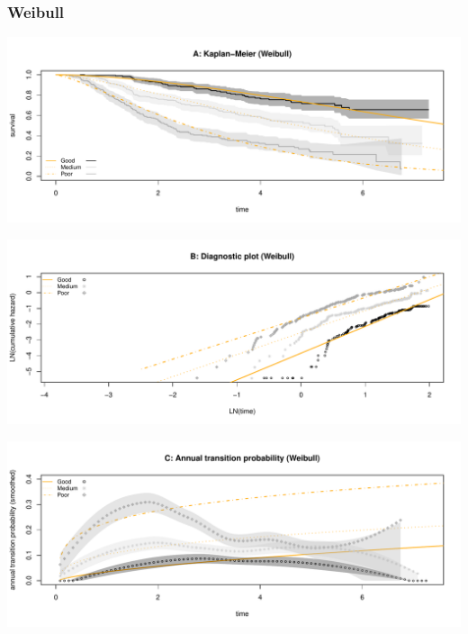 \documentclass[
]{article}
\begin{document}
\clearpage

\subsubsection{Weibull}\label{weibull}

\begin{flushleft}\includegraphics[height=0.25\textheight]{BC_OS_output/Images/Figure_param_models-4} \end{flushleft}

\begin{flushleft}\includegraphics[height=0.25\textheight]{BC_OS_output/Images/Figure_param_models-5} \end{flushleft}

\begin{flushleft}\includegraphics[height=0.25\textheight]{BC_OS_output/Images/Figure_param_models-6} \end{flushleft}
\end{document}
